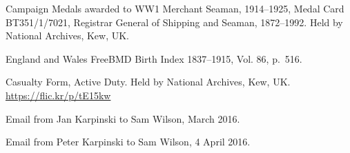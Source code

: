 \begin{thebibliography}{99}
	Campaign Medals awarded to WW1 Merchant Seaman, 1914--1925, Medal Card BT351/1/7021, Registrar General of 
	Shipping and Seaman, 1872--1992. Held by National Archives, Kew, UK.

	England and Wales FreeBMD Birth Index 1837--1915, Vol. 86, p.~516.

	Casualty Form, Active Duty. Held by National Archives, Kew, UK. \url{https://flic.kr/p/tE15kw}

	Email from Jan Karpinski to Sam Wilson, March 2016.

	Email from Peter Karpinski to Sam Wilson, 4 April 2016.

\end{thebibliography}
